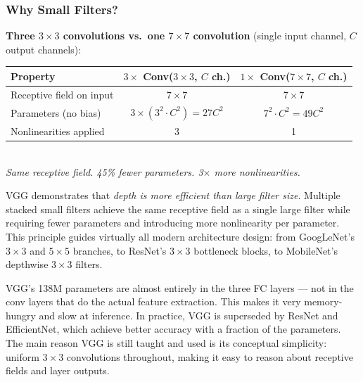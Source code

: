 \documentclass[11pt,a4paper]{article}
\begin{document}
\subsubsection{Why Small Filters?}

\begin{tcolorbox}[colback=LightBlue,colframe=AccentBlue,boxrule=0.8pt,arc=3pt]
\textbf{Three $3\times3$ convolutions vs.\ one $7\times7$ convolution} (single input channel, $C$ output channels):
\medskip\\
\begin{tabular}{@{}lcc@{}}
\toprule
\textbf{Property} & \textbf{$3\times$ Conv($3\times3$, $C$ ch.)} & \textbf{$1\times$ Conv($7\times7$, $C$ ch.)} \\
\midrule
Receptive field on input & $7\times7$ & $7\times7$ \\
Parameters (no bias) & $3 \times (3^2 \cdot C^2) = 27C^2$ & $7^2 \cdot C^2 = 49C^2$ \\
Nonlinearities applied & 3 & 1 \\
\bottomrule
\end{tabular}\\[6pt]
\textit{Same receptive field.  45\% fewer parameters.  3$\times$ more nonlinearities.}
\end{tcolorbox}

\begin{insightbox}
VGG demonstrates that \emph{depth is more efficient than large filter size}.  Multiple stacked small
filters achieve the same receptive field as a single large filter while requiring fewer parameters
and introducing more nonlinearity per parameter.  This principle guides virtually all modern
architecture design: from GoogLeNet's $3\times3$ and $5\times5$ branches, to ResNet's $3\times3$
bottleneck blocks, to MobileNet's depthwise $3\times3$ filters.
\end{insightbox}

\begin{warnbox}
VGG's 138M parameters are almost entirely in the three FC layers — not in the conv layers that
do the actual feature extraction.  This makes it very memory-hungry and slow at inference.
In practice, VGG is superseded by ResNet and EfficientNet, which achieve better accuracy with a
fraction of the parameters.  The main reason VGG is still taught and used is its conceptual
simplicity: uniform $3\times3$ convolutions throughout, making it easy to reason about receptive
fields and layer outputs.
\end{warnbox}
\end{document}
